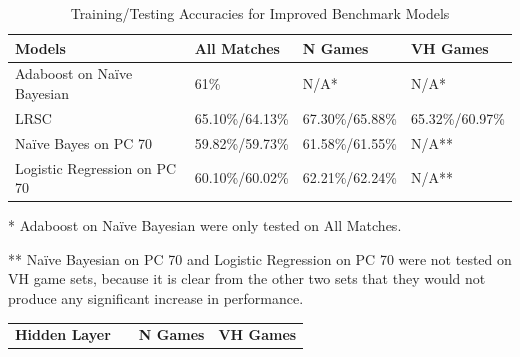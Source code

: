 \documentclass{article}
\begin{document}
\begin{appendix}
\bgroup
\def\arraystretch{1.7}%
{
\begin{table}[htb]
\begin{threeparttable}
\centering
\begin{tabularx}{\textwidth}{ |X|l|l|l| } 
\hline
\textbf{Models} & \textbf{All Matches} & \textbf{N Games} & \textbf{VH Games} \\
\hline
Adaboost on Naïve Bayesian & 61\%  & N/A*  & N/A* \\
\hline
LRSC & 65.10\%/64.13\% & 67.30\%/65.88\% & 65.32\%/60.97\% \\
\hline
Naïve Bayes on PC 70 & 59.82\%/59.73\% & 61.58\%/61.55\% & N/A** \\
\hline
Logistic Regression on PC 70 & 60.10\%/60.02\% & 62.21\%/62.24\% & N/A** \\
\hline
\end{tabularx}
       \begin{tablenotes}
            \item[*]  Adaboost on Naïve Bayesian were only tested on All Matches.
            \item[**] Naïve Bayesian on PC 70 and Logistic Regression on PC 70 were not tested on VH game sets, because it is clear from the other two sets that they would not produce any significant increase in performance.
        \end{tablenotes}
     \end{threeparttable}
\caption{Training/Testing Accuracies for Improved Benchmark Models}
\label{table:improved_benchmark}
\end{table}}
\egroup





\bgroup
\def\arraystretch{1.7}%
{
\begin{table}[htb]
\centering
\begin{tabularx}{\textwidth}{ |X|l|l|l|l|l|l|l| } 
\hline

\textbf{Hidden Layer}& & \multicolumn{3}{c|}{\textbf{N Games}} & \multicolumn{3}{c|}{\textbf{VH Games}} \\\cline{3-8}


\end{tabularx}
\end{table}}
\end{appendix}
\end{document}
